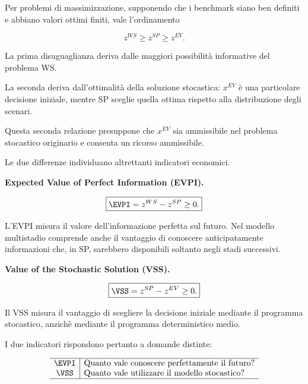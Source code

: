 Per problemi di massimizzazione,
supponendo che i benchmark siano
ben definiti e abbiano valori ottimi finiti,
vale l'ordinamento

\begin{equation}
\boxed{
z^{WS}\geq z^{SP}\geq z^{EV}.
}
\label{eq:cap15-ordinamento-benchmark-v2}
\end{equation}

La prima disuguaglianza deriva
dalle maggiori possibilit\`a
informative del problema WS.

La seconda deriva dall'ottimalit\`a
della soluzione stocastica:
$x^{EV}$ \`e una particolare decisione
iniziale, mentre SP sceglie quella ottima
rispetto alla distribuzione degli scenari.

Questa seconda relazione presuppone
che $x^{EV}$ sia ammissibile
nel problema stocastico originario
e consenta un ricorso ammissibile.

Le due differenze individuano
altrettanti indicatori economici.

\medskip

\noindent
\textbf{Expected Value of Perfect Information (EVPI).}

\begin{equation}
\boxed{
\EVPI=z^{WS}-z^{SP}\geq0.
}
\label{eq:cap15-evpi-v2}
\end{equation}

L'EVPI misura il valore dell'informazione
perfetta sul futuro.
Nel modello multistadio comprende anche
il vantaggio di conoscere anticipatamente
informazioni che, in SP, sarebbero disponibili
soltanto negli stadi successivi.

\medskip

\noindent
\textbf{Value of the Stochastic Solution (VSS).}

\begin{equation}
\boxed{
\VSS=z^{SP}-z^{EV}\geq0.
}
\label{eq:cap15-vss-v2}
\end{equation}

Il VSS misura il vantaggio di scegliere
la decisione iniziale mediante
il programma stocastico, anzich\`e
mediante il programma deterministico medio.

\medskip

I due indicatori rispondono pertanto
a domande distinte:

\[
\begin{array}{c|l}
\hline
\EVPI &
\text{Quanto vale conoscere perfettamente il futuro?}
\\
\VSS &
\text{Quanto vale utilizzare il modello stocastico?}
\\
\hline
\end{array}
\]

